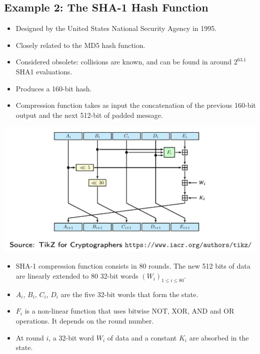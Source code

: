 	\subsection{Example 2: The SHA-1 Hash Function}
		\begin{itemize}
			\item Designed by the United States National Security Agency in 1995.
			\item Closely related to the MD5 hash function.
			\item Considered obsolete: collisions are known, and can be found in around $2^{63.1}$ SHA1 evaluations.
			\item Produces a 160-bit hash.
			\item Compression function takes as input the concatenation of the previous 160-bit output and the next 512-bit of padded message.
		\end{itemize}
	   	\begin{center}
			\includegraphics[width=140mm]{Graphics/Hash Functions/hf8.png}
		\end{center}
		\begin{itemize}
			\item SHA-1 compression function consists in 80 rounds. The new 512 bits of data are linearly extended to 80 32-bit words $(W_i)_{1 \leq i \leq 80}$.
			\item $A_i$, $B_i$, $C_i$, $D_i$ are the five 32-bit words that form the state.
			\item $F_i$ is a non-linear function that uses bitwise NOT, XOR, AND and OR operations. It depends on the round number.
			\item At round $i$, a 32-bit word $W_i$ of data and a constant $K_i$ are absorbed in the state.
		\end{itemize}
	
